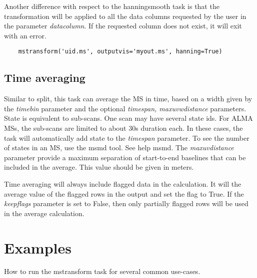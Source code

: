 Another difference with respect to the hanningsmooth task is that the transformation will be 
applied to all the data columns requested by the user in the parameter {\it datacolumn}. If the 
requested column does not exist, it will exit with an error. 

\begin{verbatim}
    mstransform('uid.ms', outputvis='myout.ms', hanning=True)
\end{verbatim}

\subsection{Time averaging}
Similar to split, this task can average the MS in time, based on a width given by the
{\it timebin} parameter and the optional {\it timespan, maxuvwdistance}
parameters. State is equivalent to sub-scans. One scan may have several
state ids. For ALMA MSs, the sub-scans are limited to about 30s duration each.
In these cases, the task will automatically add state to the {\it timespan} 
parameter. To see the number of states in an MS, use the msmd tool. See help
msmd. The {\it maxuvdistance} parameter provide a maximum separation of
start-to-end baselines that can be included in the average. This value should be
given in meters.

Time averaging will always include flagged data in the calculation. It will
the average value of the flagged rows in the output and set the flag to True.
If the {\it keepflags} parameter is set to False, then only partially flagged
rows will be used in the average calculation. 



\section{Examples}\label{Sec:Examples}
How to run the mstransform task for several common use-cases.

